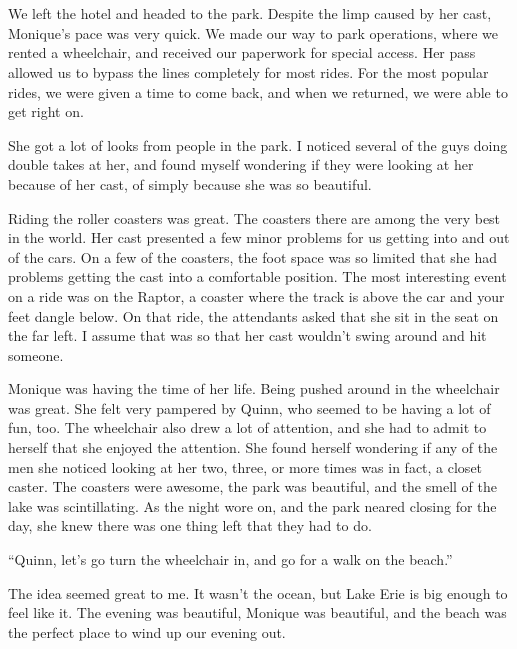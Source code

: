 \chapter{}
We left the hotel and headed to the park. Despite the limp caused by her cast, Monique's
pace was very quick. We made our way to park operations, where we rented a wheelchair, and
received our paperwork for special access. Her pass allowed us to bypass the lines completely
for most rides. For the most popular rides, we were given a time to come back, and when we
returned, we were able to get right on.

She got a lot of looks from people in the park. I noticed several of the guys doing double
takes at her, and found myself wondering if they were looking at her because of her cast, of
simply because she was so beautiful.

Riding the roller coasters was great. The coasters there are among the very best in the
world. Her cast presented a few minor problems for us getting into and out of the cars. On a few
of the coasters, the foot space was so limited that she had problems getting the cast into a
comfortable position. The most interesting event on a ride was on the Raptor, a coaster where
the track is above the car and your feet dangle below. On that ride, the attendants asked that
she sit in the seat on the far left. I assume that was so that her cast wouldn't swing around
and hit someone.

\begin{thought}
Monique was having the time of her life. Being pushed around in the wheelchair was great.
She felt very pampered by Quinn, who seemed to be having a lot of fun, too. The wheelchair also
drew a lot of attention, and she had to admit to herself that she enjoyed the attention. She
found herself wondering if any of the men she noticed looking at her two, three, or more times
was in fact, a closet caster. The coasters were awesome, the park was beautiful, and the smell
of the lake was scintillating. As the night wore on, and the park neared closing for the day,
she knew there was one thing left that they had to do.
\end{thought}

``Quinn, let's go turn the wheelchair in, and go for a walk on the beach.''

The idea seemed great to me. It wasn't the ocean, but Lake Erie is big enough to feel like
it. The evening was beautiful, Monique was beautiful, and the beach was the perfect place to
wind up our evening out.

